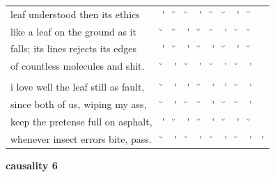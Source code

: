 \documentclass[12pt, landscape]{article}
\begin{document}
\begin{center}
\begin{tabularx}{\textwidth}{
>{\lefting\arraybackslash}X
c
c
c
c
c
c
c
c
c
}

leaf understood then its ethics & \'{} & \u{} & \u{} & \'{} & \u{} & \u{} & \'{} & \u{} & \\
like a leaf on the ground as it & \u{} & \u{} & \'{} & \u{} & \u{} & \'{} & \u{} & \u{} & \\
falls; its lines rejects its edges & \'{} & \u{} & \'{} & \u{} & \'{} & \u{} & \'{} & \u{} & \\
of countless molecules and shit. & \u{} & \'{} & \u{} & \'{} & \u{} & \'{} & \u{} & \'{} & \\
 & & & & & & & & \\
i love well the leaf still as fault, & \u{} & \'{} & \'{} & \u{} & \'{} & \'{} & \u{} & \'{} & \\
since both of us, wiping my ass, & \u{} & \'{} & \u{} & \u{} & \'{} & \u{} & \u{} & \'{} & \\
keep the pretense full on asphalt, & \'{} & \u{} & \'{} & \u{} & \'{} & \u{} & \'{} & \u{} & \\
whenever insect errors bite, pass. & \u{} & \'{} & \u{} & \'{} & \u{} & \'{} & \u{} & \'{} & \'{} \\

\end{tabularx}
\end{center}

\vspace*{\fill}

\newpage

\vspace*{\fill}

\noindent \textbf{causality 6}
\noindent \hfill \par
\end{document}

